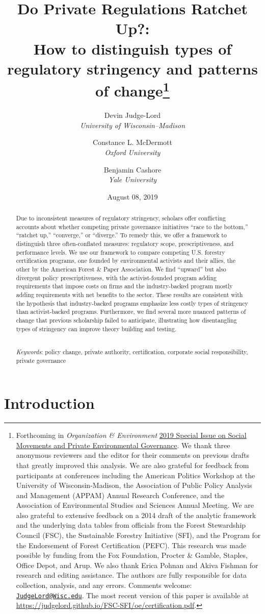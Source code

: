 \documentclass[
      12pt,
            Review ]{article}
\title{Do Private Regulations Ratchet Up?: 
           \\ How to distinguish types of regulatory stringency and patterns of change\thanks{Forthcoming in \emph{Organization \& Environment}
\href{https://journals.sagepub.com/doi/full/10.1177/1086026619853783}{2019
Special Issue on Social Movements and Private Environmental Governance}.
We thank three anonymous reviewers and the editor for their comments on
previous drafts that greatly improved this analysis. We are also
grateful for feedback from participants at conferences including the
American Politics Workshop at the University of Wisconsin-Madison, the
Association of Public Policy Analysis and Management (APPAM) Annual
Research Conference, and the Association of Environmental Studies and
Sciences Annual Meeting. We are also grateful to extensive feedback on a
2014 draft of the analytic framework and the underlying data tables from
officials from the Forest Stewardship Council (FSC), the Sustainable
Forestry Initiative (SFI), and the Program for the Endorsement of Forest
Certification (PEFC). This research was made possible by funding from
the Fox Foundation, Procter \& Gamble, Staples, Office Depot, and Arup.
We also thank Erica Pohnan and Akiva Fishman for research and editing
assistance. The authors are fully responsible for data collection,
analysis, and any errors. Comments welcome:
\href{mailto:JudgeLord@Wisc.edu}{\nolinkurl{JudgeLord@Wisc.edu}}. The
most recent version of this paper is available at
\url{https://judgelord.github.io/FSC-SFI/oe/certification.pdf}.}}
\author{ %
            Devin Judge-Lord  \\ \emph{University of Wisconsin--Madison} 
             \and 
            Constance L. McDermott  \\ \emph{Oxford University} 
             \and 
            Benjamin Cashore  \\ \emph{Yale University} 
            }
\date{August 08, 2019}
\begin{document}
 


  \maketitle




  \begin{abstract}
    \noindent Due to inconsistent measures of regulatory stringency, scholars offer
conflicting accounts about whether competing private governance
initiatives ``race to the bottom,'' ``ratchet up,'' ``converge,'' or
``diverge.'' To remedy this, we offer a framework to distinguish three
often-conflated measures: regulatory scope, prescriptiveness, and
performance levels. We use our framework to compare competing U.S.
forestry certification programs, one founded by environmental activists
and their allies, the other by the American Forest \& Paper Association.
We find ``upward'' but also divergent policy prescriptiveness, with the
activist-founded program adding requirements that impose costs on firms
and the industry-backed program mostly adding requirements with net
benefits to the sector. These results are consistent with the hypothesis
that industry-backed programs emphasize less costly types of stringency
than activist-backed programs. Furthermore, we find several more nuanced
patterns of change that previous scholarship failed to anticipate,
illustrating how disentangling types of stringency can improve theory
building and testing. 

          \hfill \\ 
      \noindent \emph{Keywords}: policy change, private authority, certification, corporate social
responsibility, private governance 
    
  \end{abstract}










\noindent 
      \doublespacing 
    \newpage

\section{Introduction}\label{introduction}
\end{document}
